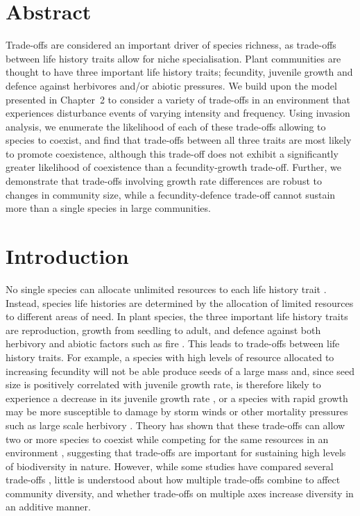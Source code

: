 \newpage
{}
\vspace*{\fill}
\section*{Abstract}
Trade-offs are considered an important driver of species richness, as trade-offs between life history traits allow for niche specialisation. Plant communities are thought to have three important life history traits; fecundity, juvenile growth and defence against herbivores and/or abiotic pressures. We build upon the model presented in Chapter~2 to consider a variety of trade-offs in an environment that experiences disturbance events of varying intensity and frequency. Using invasion analysis, we enumerate the likelihood of each of these trade-offs allowing to species to coexist, and find that trade-offs between all three traits are most likely to promote coexistence, although this trade-off does not exhibit a significantly greater likelihood of coexistence than a fecundity-growth trade-off. Further, we demonstrate that trade-offs involving growth rate differences are robust to changes in community size, while a fecundity-defence trade-off cannot sustain more than a single species in large communities. 
\vspace*{\fill}
\newpage

\section{Introduction}
No single species can allocate unlimited resources to each life history trait \citep{law1979optimal,tilman1982resource}. Instead, species life histories are determined by the allocation of limited resources to different areas of need. In plant species, the three important life history traits are reproduction, growth from seedling to adult, and defence against both herbivory and abiotic factors such as fire \citep{bazzaz1987allocating}. This leads to trade-offs between life history traits. For example, a species with high levels of resource allocated to increasing fecundity will not be able produce seeds of a large mass \citep{turnbull1999seed} and, since seed size is positively correlated with juvenile growth rate, is therefore likely to experience a decrease in its juvenile growth rate \citep{gross1984effects}, or a species with rapid growth may be more susceptible to damage by storm winds or other mortality pressures such as large scale herbivory \citep[e.g.][]{wright2010functional,fine2006growth}. Theory has shown that these trade-offs can allow two or more species to coexist while competing for  the same resources in an environment \citep[e.g.][]{kisdi2003coexistence,levins1971regional,bonsall2004life}, suggesting that trade-offs are important for sustaining high levels of biodiversity in nature. However, while some studies have compared several trade-offs \citep[e.g.][]{tilman1990constraints,grime1977evidence}, little is understood about how multiple trade-offs combine to affect community diversity, and whether trade-offs on multiple axes increase diversity in an additive manner.

